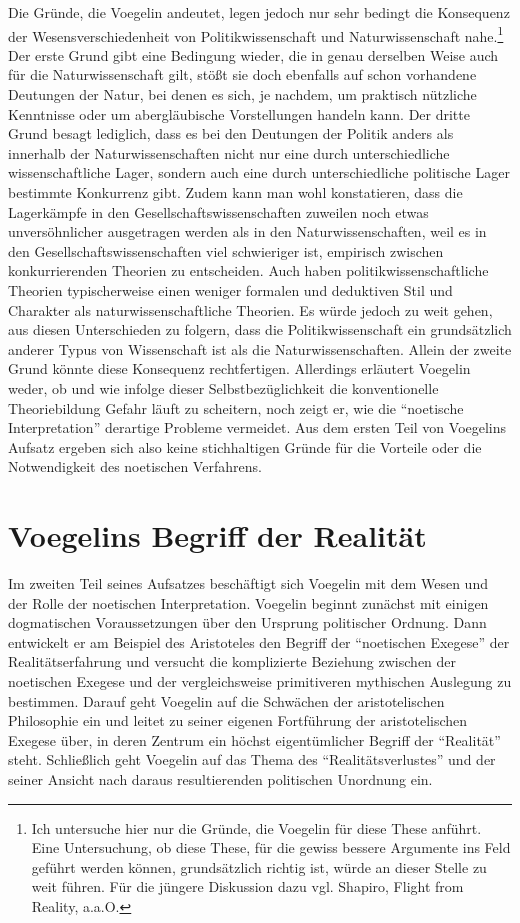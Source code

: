 Die Gründe, die Voegelin andeutet, legen jedoch nur sehr bedingt die
Konsequenz der Wesensverschiedenheit von Politikwissenschaft und
Naturwissenschaft nahe.\footnote{Ich untersuche hier nur die Gründe, die
  Voegelin für diese These anführt. Eine Untersuchung, ob diese These, für die
  gewiss bessere Argumente ins Feld geführt werden können, grundsätzlich
  richtig ist, würde an dieser Stelle zu weit führen. Für die jüngere
  Diskussion dazu vgl. Shapiro, Flight from Reality, a.a.O.} Der erste Grund
gibt eine Bedingung wieder, die in genau derselben Weise auch für die
Naturwissenschaft gilt, stößt sie doch ebenfalls auf schon vorhandene
Deutungen der Natur, bei denen es sich, je nachdem, um praktisch nützliche
Kenntnisse oder um abergläubische Vorstellungen handeln kann. Der dritte Grund
besagt lediglich, dass es bei den Deutungen der Politik anders als innerhalb
der Naturwissenschaften nicht nur eine durch unterschiedliche
wissenschaftliche Lager, sondern auch eine durch unterschiedliche politische
Lager bestimmte Konkurrenz gibt. Zudem kann man wohl konstatieren, dass die
Lagerkämpfe in den Gesellschaftswissenschaften zuweilen noch etwas
unversöhnlicher ausgetragen werden als in den Naturwissenschaften, weil es in
den Gesellschaftswissenschaften viel schwieriger ist, empirisch zwischen
konkurrierenden Theorien zu entscheiden. Auch haben politikwissenschaftliche
Theorien typischerweise einen weniger formalen und deduktiven Stil und
Charakter als naturwissenschaftliche Theorien. Es würde jedoch zu weit gehen,
aus diesen Unterschieden zu folgern, dass die Politikwissenschaft ein
grundsätzlich anderer Typus von Wissenschaft ist als die Naturwissenschaften.
Allein der zweite Grund könnte diese Konsequenz rechtfertigen. Allerdings
erläutert Voegelin weder, ob und wie infolge dieser Selbstbezüglichkeit die
konventionelle Theoriebildung Gefahr läuft zu scheitern, noch zeigt er, wie
die "`noetische Interpretation"' derartige Probleme vermeidet. Aus dem ersten
Teil von Voegelins Aufsatz ergeben sich also keine stichhaltigen Gründe für
die Vorteile oder die Notwendigkeit des noetischen Verfahrens.

\section{Voegelins Begriff der Realität}
 
Im zweiten Teil seines Aufsatzes beschäftigt sich Voegelin mit dem Wesen und
der Rolle der noetischen Interpretation. Voegelin beginnt zunächst mit einigen
dogmatischen Voraussetzungen über den Ursprung politischer Ordnung.  Dann
entwickelt er am Beispiel des Aristoteles den Begriff der "`noetischen
Exegese"' der Realitätserfahrung und versucht die komplizierte Beziehung
zwischen der noetischen Exegese und der vergleichsweise primitiveren
mythischen Auslegung zu bestimmen. Darauf geht Voegelin auf die Schwächen der
aristotelischen Philosophie ein und leitet zu seiner eigenen Fortführung der
aristotelischen Exegese über, in deren Zentrum ein höchst eigentümlicher
Begriff der "`Realität"' steht. Schließlich geht Voegelin auf das Thema des
"`Realitätsverlustes"' und der seiner Ansicht nach daraus resultierenden
politischen Unordnung ein.
 
